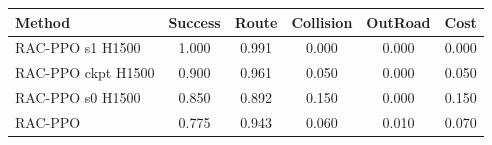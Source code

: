 \begin{tabular}{lccccc}
\toprule
Method & Success & Route & Collision & OutRoad & Cost \\ 
\midrule
RAC-PPO s1 H1500 & 1.000 & 0.991 & 0.000 & 0.000 & 0.000 \\ 
RAC-PPO ckpt H1500 & 0.900 & 0.961 & 0.050 & 0.000 & 0.050 \\ 
RAC-PPO s0 H1500 & 0.850 & 0.892 & 0.150 & 0.000 & 0.150 \\ 
RAC-PPO & 0.775 & 0.943 & 0.060 & 0.010 & 0.070 \\ 
\bottomrule
\end{tabular}
